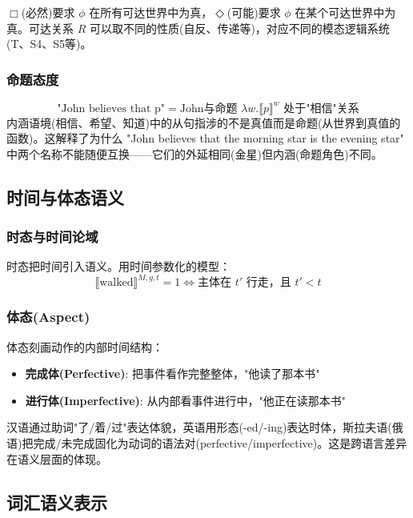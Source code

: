 $\Box$(必然)要求 $\phi$ 在所有可达世界中为真，$\Diamond$(可能)要求 $\phi$ 在某个可达世界中为真。可达关系 $R$ 可以取不同的性质(自反、传递等)，对应不同的模态逻辑系统(T、S4、S5等)。

\subsubsection{命题态度}

\begin{equation}
    \text{"John believes that p"} = \text{John与命题 } \lambda w.\llbracket p \rrbracket^w \text{ 处于"相信"关系}
\end{equation}
内涵语境(相信、希望、知道)中的从句指涉的不是真值而是命题(从世界到真值的函数)。这解释了为什么 "John believes that the morning star is the evening star" 中两个名称不能随便互换——它们的外延相同(金星)但内涵(命题角色)不同。

\subsection{时间与体态语义}

\subsubsection{时态与时间论域}

时态把时间引入语义。用时间参数化的模型：
\begin{equation}
    \llbracket \text{walked} \rrbracket^{M,g,t} = 1 \iff \text{主体在 } t' \text{ 行走，且 } t' < t
\end{equation}

\subsubsection{体态(Aspect)}

体态刻画动作的内部时间结构：
\begin{itemize}
    \item \textbf{完成体(Perfective)}: 把事件看作完整整体，"他读了那本书"
    \item \textbf{进行体(Imperfective)}: 从内部看事件进行中，"他正在读那本书"
\end{itemize}
汉语通过助词"了/着/过"表达体貌，英语用形态(-ed/-ing)表达时体，斯拉夫语(俄语)把完成/未完成固化为动词的语法对(perfective/imperfective)。这是跨语言差异在语义层面的体现。

\subsection{词汇语义表示}

